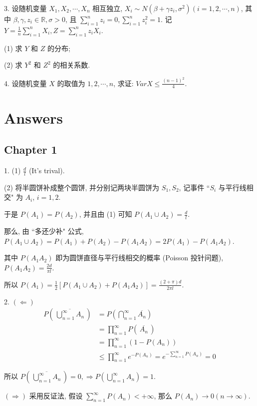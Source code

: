 \documentclass[UTF8]{ctexart}
\begin{document}
3. 设随机变量 $X_1,X_2,\cdots,X_n$ 相互独立, $X_i\sim N(\beta+\gamma z_i,\sigma^2)(i=1,2,\cdots,n)$, 其中 $\beta,\gamma,z_i\in\mathbb{R},\sigma>0$, 且 $\displaystyle\sum\limits_{i=1}^{n}z_i=0, \sum\limits_{i=1}^{n}z_i^2=1$. 记 $\displaystyle Y=\frac{1}{n}\sum\limits_{i=1}^{n}X_i, Z=\sum\limits_{i=1}^{n}z_iX_i$.

(1) 求 $Y$ 和 $Z$ 的分布;

(2) 求 $Y^2$ 和 $Z^2$ 的相关系数.

4. 设随机变量 $X$ 的取值为 $1,2,\cdots,n$, 求证: $Var X \leq \displaystyle\frac{(n-1)^2}{4}$.

\section*{Answers}
\subsection*{Chapter 1}
1. (1) $\displaystyle\frac{d}{l}$ (It's trival).

(2) 将半圆饼补成整个圆饼, 并分别记两块半圆饼为 $S_1,S_2$, 记事件 ``$S_i$ 与平行线相交" 为 $A_i$, $i=1,2$.

于是 $P(A_1)=P(A_2)$, 并且由 (1) 可知 $P(A_1\cup A_2)=\displaystyle\frac{d}{l}$.

那么, 由 ``多还少补" 公式, $P(A_1\cup A_2)=P(A_1)+P(A_2)-P(A_1A_2)=2P(A_1)-P(A_1A_2)$.

其中 $P(A_1A_2)$ 即为圆饼直径与平行线相交的概率 (Poisson 投针问题), $P(A_1A_2)=\displaystyle\frac{2d}{\pi l}$.

所以 $P(A_1)=\displaystyle\frac{1}{2}\left[P(A_1\cup A_2)+P(A_1A_2)\right]=\frac{(2+\pi)d}{2\pi l}$.

2. $(\Leftarrow)$ \[
\begin{aligned}
P\left(\, \overline{\bigcup_{n=1}^{\infty}A_n} \,\right)&=P\left(\bigcap_{n=1}^{\infty}\overline{A_n}\right)\\
 &=\prod_{n=1}^{\infty}P\left(\,\overline{A_n}\,\right) \\
 &=\prod_{n=1}^{\infty}\left(1-P(A_n)\right)\\
 &\leq\prod_{n=1}^{\infty}e^{-P(A_n)}=e^{-\sum\limits_{n=1}^{\infty}P(A_n)}=0
\end{aligned}
\]

所以 $\displaystyle P\left(\, \overline{\bigcup_{n=1}^{\infty}A_n} \,\right)=0, \Rightarrow P\left(\bigcup_{n=1}^{\infty}A_n\right)=1$.

$(\Rightarrow)$ 采用反证法, 假设 $\displaystyle\sum\limits_{n=1}^{\infty}P(A_n)<+\infty$, 那么 $P(A_n)\rightarrow0(n\rightarrow\infty)$.
\end{document}

